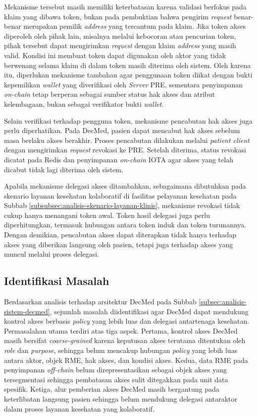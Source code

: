 \documentclass[bahasa, 12pt, a4paper, onecolumn, oneside, final]{report}
\begin{document}
Mekanisme tersebut masih memiliki keterbatasan karena validasi berfokus pada klaim yang dibawa token, bukan pada pembuktian bahwa pengirim \textit{request} benar-benar merupakan pemilik \textit{address} yang tercantum pada klaim. Jika token akses diperoleh oleh pihak lain, misalnya melalui kebocoran atau pencurian token, pihak tersebut dapat mengirimkan \textit{request} dengan klaim \textit{address} yang masih valid. Kondisi ini membuat token dapat digunakan oleh aktor yang tidak berwenang selama klaim di dalam token masih diterima oleh sistem. Oleh karena itu, diperlukan mekanisme tambahan agar penggunaan token diikat dengan bukti kepemilikan \textit{wallet} yang diverifikasi oleh \textit{Server} PRE, sementara penyimpanan \textit{on-chain} tetap berperan sebagai sumber status hak akses dan atribut kelembagaan, bukan sebagai verifikator bukti \textit{wallet}.

Selain verifikasi terhadap pengguna token, mekanisme pencabutan hak akses juga perlu diperhatikan. Pada DecMed, pasien dapat mencabut hak akses sebelum masa berlaku akses berakhir. Proses pencabutan dilakukan melalui \textit{patient client} dengan mengirimkan \textit{request} revokasi ke PRE. Setelah diterima, status revokasi dicatat pada Redis dan penyimpanan \textit{on-chain} IOTA agar akses yang telah dicabut tidak lagi diterima oleh sistem.

Apabila mekanisme delegasi akses ditambahkan, sebagaimana dibutuhkan pada skenario layanan kesehatan kolaboratif di fasilitas pelayanan kesehatan pada Subbab \ref{subsubsec:analisis-skenario-layanan-klinis}, mekanisme revokasi tidak cukup hanya menangani token awal. Token hasil delegasi juga perlu diperhitungkan, termasuk hubungan antara token induk dan token turunannya. Dengan demikian, pencabutan akses dapat diterapkan tidak hanya terhadap akses yang diberikan langsung oleh pasien, tetapi juga terhadap akses yang muncul melalui proses delegasi.
\subsection{Identifikasi Masalah}
\label{subsec:identifikasi-masalah}

Berdasarkan analisis terhadap arsitektur DecMed pada Subbab \ref{subsec:analisis-sistem-decmed}, sejumlah masalah diidentifikasi agar DecMed dapat mendukung kontrol akses berbasis \textit{policy} yang lebih luas dan delegasi antartenaga kesehatan. Permasalahan utama terdiri atas tiga aspek. Pertama, kontrol akses DecMed masih bersifat \textit{coarse-grained} karena keputusan akses terutama ditentukan oleh \textit{role} dan \textit{purpose}, sehingga belum mencakup hubungan \textit{policy} yang lebih luas antara aktor, objek RME, hak akses, dan kondisi akses. Kedua, data RME pada penyimpanan \textit{off-chain} belum direpresentasikan sebagai objek akses yang tersegmentasi sehingga pembatasan akses sulit ditegakkan pada unit data spesifik. Ketiga, alur pemberian akses DecMed masih bergantung pada keterlibatan langsung pasien sehingga belum mendukung delegasi antaraktor dalam proses layanan kesehatan yang kolaboratif.
\end{document}
